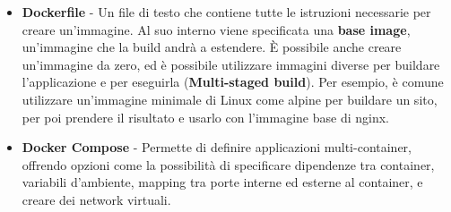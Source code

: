 \begin{itemize}
\begin{figure}[H]
      \caption{Schema sul funzionamento di Docker}
    \end{figure}
  \item \textbf{Dockerfile} - Un file di testo che contiene tutte le istruzioni necessarie per creare un'immagine. Al suo interno viene specificata una \textbf{base image},
    un'immagine che la build andr\`a a estendere. \`E possibile anche creare un'immagine da zero, ed \`e possibile utilizzare immagini diverse per buildare l'applicazione e per eseguirla
    (\textbf{Multi-staged build}). Per esempio, \`e comune utilizzare un'immagine minimale di Linux come alpine per buildare un sito, per poi prendere il risultato e usarlo con
    l'immagine base di nginx.
  \item \textbf{Docker Compose} - Permette di definire applicazioni multi-container, offrendo opzioni come la possibilit\`a di specificare dipendenze tra container, variabili d'ambiente,
    mapping tra porte interne ed esterne al container, e creare dei network virtuali.
\end{itemize}

